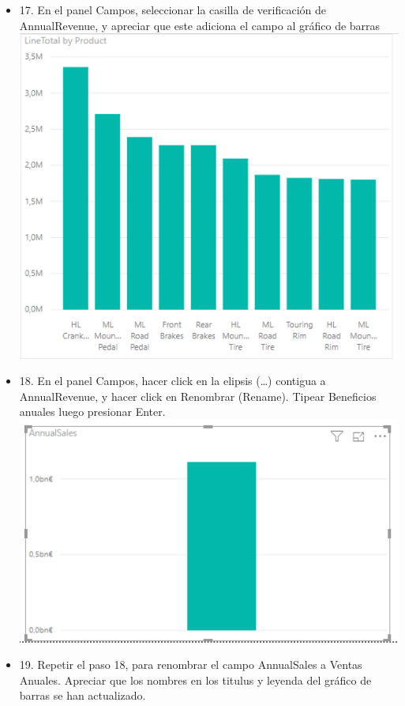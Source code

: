 \begin{itemize}
\item 17. En el panel Campos, seleccionar la casilla de verificación de AnnualRevenue, y apreciar que este adiciona el campo al gráfico de barras \\
\includegraphics[scale=0.5]{./Imagenes/image026}
\item 18. En el panel Campos, hacer click en la elipsis (…) contigua a AnnualRevenue, y hacer click en Renombrar (Rename). Tipear Beneficios anuales luego presionar Enter. \\
\includegraphics[scale=0.5]{./Imagenes/image028}
\item 19. Repetir el paso 18, para renombrar el campo AnnualSales a Ventas Anuales. Apreciar que los nombres en los titulus y leyenda del gráfico de barras se han actualizado. \\




\end{itemize}
